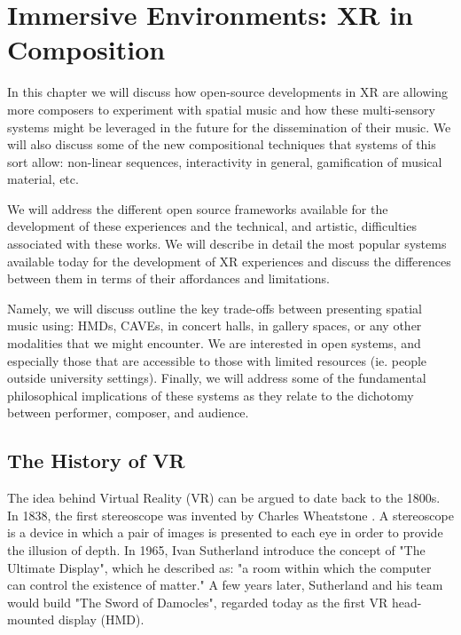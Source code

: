 \chapter{Immersive Environments: XR in Composition}
\label{ch:xr-mus}





In this chapter we will discuss how open-source developments in XR are allowing more composers to experiment with spatial music and how these multi-sensory systems might be leveraged in the future for the dissemination of their music. We will also discuss some of the new compositional techniques that systems of this sort allow: non-linear sequences, interactivity in general, gamification of musical material, etc. 

We will address the different open source frameworks available for the development of these experiences and the technical, and artistic, difficulties associated with these works. We will describe in detail the most popular systems available today for the development of XR experiences and discuss the differences between them in terms of their affordances and limitations.

Namely, we will discuss outline the key trade-offs between presenting spatial music using: HMDs, CAVEs, in concert halls, in gallery spaces, or any other modalities that we might encounter. We are interested in open systems, and especially those that are accessible to those with limited resources (ie. people outside university settings). Finally, we will address some of the fundamental philosophical implications of these systems as they relate to the dichotomy between performer, composer, and audience. 

\section{The History of VR}
The idea behind Virtual Reality (VR) can be argued to date back to the 1800s. In 1838, the first stereoscope was invented by Charles Wheatstone \cite{hemstrom2020comparison}. A stereoscope is a device in which a pair of images is presented to each eye in order to provide the illusion of depth. In 1965, Ivan Sutherland introduce the concept of "The Ultimate Display", which he described as: "a room within which the computer can control the existence of matter." \cite{sutherland1965ultimate} A few years later, Sutherland and his team would build "The Sword of Damocles", regarded today as the first VR head-mounted display (HMD).


